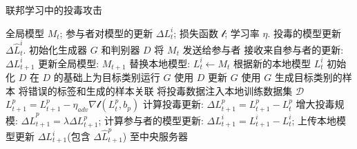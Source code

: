 \documentclass[../main.tex]{subfiles}
\begin{document}
\begin{breakablealgorithm}
  \caption{联邦学习中的投毒攻击}
  \begin{algorithmic}
    \Require 全局模型 $ M_t $; 参与者对模型的更新 $ \Delta L_t^i $;
    损失函数 $ \mathcal{l} $; 学习率 $ \eta $.
    \Ensure 投毒的模型更新 $ \Delta \hat{L}_t^i $.
    \State 初始化生成器 $ G $ 和判别器 $ D $
    \State 将 $ M_t $ 发送给参与者 
    \State 接收来自参与者的更新: $ \Delta L_{t+1}^i $
    \State 更新全局模型: $ M_{t+1} $
    \State 替换本地模型: $ L_t^i \gets M_t $ 
    \State 根据新的本地模型 $ L_t^i $ 初始化 $ D $
    \State 在 $ D $ 的基础上为目标类别运行 $ G $
    \State 使用 $ D $ 更新 $ G $
    \State 使用 $ G $ 生成目标类别的样本
    \State 将错误的标签和生成的样本关联
    \State 将投毒数据注入本地训练数据集 $ \mathcal{D} $
    \State $ L_{t+1}^p = L_{t+1}^p - \eta_{adv}\nabla\mathcal{l}(L_t^p, b_p) $
    \EndFor
    \EndFor
    \State 计算投毒更新: $ \Delta L_{t+1}^p = L_{t+1}^p - L_t^p $
    \State 增大投毒规模: $ \Delta \hat{L}_{t+1}^p = \lambda \Delta L_{t+1}^p $;
    \Else
    \State 计算参与者的模型更新: $ \Delta L_{t+1}^i = L_{t+1}^i - L_t^i $;
    \EndIf
    \State 上传本地模型更新 $ \Delta L_{t+1}^i $(包含 $ \Delta \hat{L}_{t+1}^p $) 至中央服务器
    \EndFor
  \end{algorithmic}
\end{breakablealgorithm}
%
\end{document}
